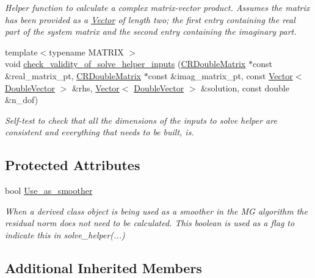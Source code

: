 \begin{DoxyCompactItemize}
\begin{DoxyCompactList}\small\item\em Helper function to calculate a complex matrix-\/vector product. Assumes the matrix has been provided as a \hyperlink{classoomph_1_1Vector}{Vector} of length two; the first entry containing the real part of the system matrix and the second entry containing the imaginary part. \end{DoxyCompactList}\item 
{\footnotesize template$<$typename M\+A\+T\+R\+IX $>$ }\\void \hyperlink{classoomph_1_1HelmholtzSmoother_a10dbef9689095e84e92f6864938850f7}{check\+\_\+validity\+\_\+of\+\_\+solve\+\_\+helper\+\_\+inputs} (\hyperlink{classoomph_1_1CRDoubleMatrix}{C\+R\+Double\+Matrix} $\ast$const \&real\+\_\+matrix\+\_\+pt, \hyperlink{classoomph_1_1CRDoubleMatrix}{C\+R\+Double\+Matrix} $\ast$const \&imag\+\_\+matrix\+\_\+pt, const \hyperlink{classoomph_1_1Vector}{Vector}$<$ \hyperlink{classoomph_1_1DoubleVector}{Double\+Vector} $>$ \&rhs, \hyperlink{classoomph_1_1Vector}{Vector}$<$ \hyperlink{classoomph_1_1DoubleVector}{Double\+Vector} $>$ \&solution, const double \&n\+\_\+dof)
\begin{DoxyCompactList}\small\item\em Self-\/test to check that all the dimensions of the inputs to solve helper are consistent and everything that needs to be built, is. \end{DoxyCompactList}\end{DoxyCompactItemize}
\subsection*{Protected Attributes}
\begin{DoxyCompactItemize}
\item 
bool \hyperlink{classoomph_1_1HelmholtzSmoother_a2b4b16dcb611cb27371afa1636e125cf}{Use\+\_\+as\+\_\+smoother}
\begin{DoxyCompactList}\small\item\em When a derived class object is being used as a smoother in the MG algorithm the residual norm does not need to be calculated. This boolean is used as a flag to indicate this in solve\+\_\+helper(...) \end{DoxyCompactList}\end{DoxyCompactItemize}
\subsection*{Additional Inherited Members}


